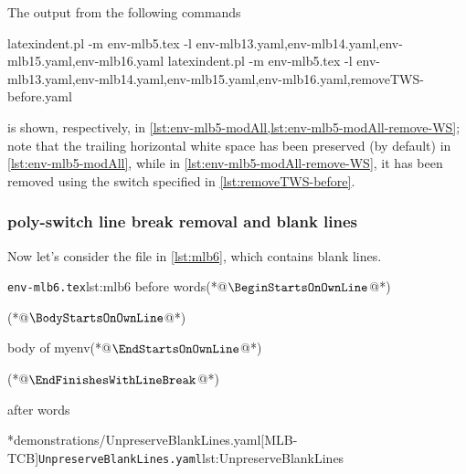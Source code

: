 	The output from the following commands \begin{widepage} \begin{commandshell}
latexindent.pl -m env-mlb5.tex -l env-mlb13.yaml,env-mlb14.yaml,env-mlb15.yaml,env-mlb16.yaml
latexindent.pl -m env-mlb5.tex -l env-mlb13.yaml,env-mlb14.yaml,env-mlb15.yaml,env-mlb16.yaml,removeTWS-before.yaml
\end{commandshell} \end{widepage} is shown, respectively, in \cref{lst:env-mlb5-modAll,lst:env-mlb5-modAll-remove-WS}; note that the trailing horizontal white space has been preserved (by default) in \cref{lst:env-mlb5-modAll}, while in \cref{lst:env-mlb5-modAll-remove-WS}, it has been removed using the switch specified in \cref{lst:removeTWS-before}.

	\begin{widepage}

	\end{widepage}

\subsubsection{poly-switch line break removal and blank lines}
	Now let's consider the file in \cref{lst:mlb6}, which contains blank lines.

	\begin{minipage}{.45\linewidth}
		\begin{cmhlistings}[style=tcblatex,escapeinside={(*@}{@*)}]{\texttt{env-mlb6.tex}}{lst:mlb6}
before words(*@$\BeginStartsOnOwnLine$@*)


\begin{myenv}(*@$\BodyStartsOnOwnLine$@*)


body of myenv(*@$\EndStartsOnOwnLine$@*)


\end{myenv}(*@$\EndFinishesWithLineBreak$@*)

after words
\end{cmhlistings}
	\end{minipage}%
	\hfill
	\begin{minipage}{.45\linewidth}
		\cmhlistingsfromfile[style=yaml-LST]*{demonstrations/UnpreserveBlankLines.yaml}[MLB-TCB]{\texttt{UnpreserveBlankLines.yaml}}{lst:UnpreserveBlankLines}
	\end{minipage}

